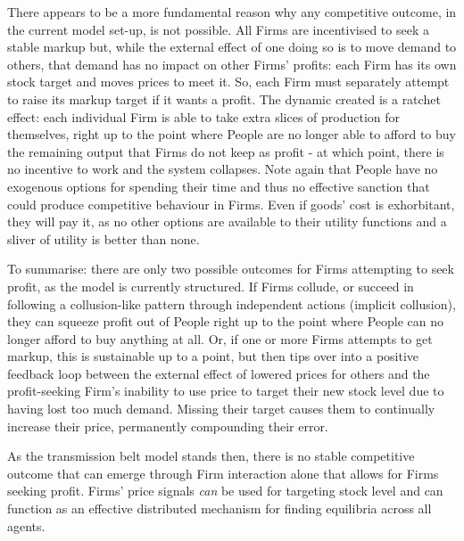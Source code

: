 There appears to be a more fundamental reason why any competitive outcome, in the current model set-up, is not possible. All Firms are incentivised to seek a stable markup but, while the external effect of one doing so is to move demand to others, that demand has no impact on other Firms' profits: each Firm has its own stock target and moves prices to meet it. So, each Firm must separately attempt to raise its markup target if it wants a profit. The dynamic created is a ratchet effect: each individual Firm is able to take extra slices of production for themselves, right up to the point where People are no longer able to afford to buy the remaining output that Firms do not keep as profit - at which point, there is no incentive to work and the system collapses. Note again that People have no exogenous options for spending their time and thus no effective sanction that could produce competitive behaviour in Firms. Even if goods' cost is exhorbitant, they will pay it, as no other options are available to their utility functions and a sliver of utility is better than none. 

To summarise: there are only two possible outcomes for Firms attempting to seek profit, as the model is currently structured. If Firms collude, or succeed in following a collusion-like pattern through independent actions (implicit collusion), they can squeeze profit out of People right up to the point where People can no longer afford to buy anything at all. Or, if one or more Firms attempts to get markup, this is sustainable up to a point, but then tips over into a positive feedback loop between the external effect of lowered prices for others and the profit-seeking Firm's inability to use price to target their new stock level due to having lost too much demand. Missing their target causes them to continually increase their price, permanently compounding their error. 

As the transmission belt model stands then, there is no stable competitive outcome that can emerge through Firm interaction alone that allows for Firms seeking profit. Firms' price signals \emph{can} be used for targeting stock level and can function as an effective distributed mechanism for finding equilibria across all agents. 

